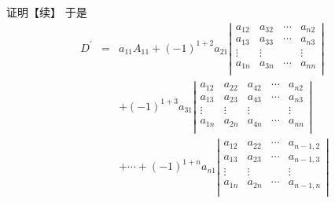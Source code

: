 \begin{frame}
  \begin{block}{证明【续】}
    于是
    $$
    \begin{array}{rcl}
      D^\prime &=& a_{11} A_{11}+(-1)^{1+2}a_{21}
      \left|
      \begin{array}{cccc}
        a_{12} & a_{32} & \cdots & a_{n2} \\
        a_{13} & a_{33} & \cdots & a_{n3} \\
        \vdots & \vdots & & \vdots \\
        a_{1n} & a_{3n} & \cdots & a_{nn} \\
      \end{array}
      \right| \\[0.4in]
      && + (-1)^{1+3}a_{31}
      \left|
      \begin{array}{ccccc}
        a_{12} & a_{22} & a_{42} & \cdots & a_{n2} \\
        a_{13} & a_{23} & a_{43} & \cdots & a_{n3} \\
        \vdots & \vdots & \vdots & & \vdots \\
        a_{1n} & a_{2n} & a_{4n} & \cdots & a_{nn} \\
      \end{array}
      \right|  \\[0.4in]
      && + \cdots + (-1)^{1+n} a_{n1} \left|
      \begin{array}{cccc}
        a_{12} & a_{22} & \cdots & a_{n-1,2} \\
        a_{13} & a_{23} & \cdots & a_{n-1,3} \\
        \vdots & \vdots & & \vdots \\
        a_{1n} & a_{2n} & \cdots & a_{n-1,n} \\
      \end{array}
      \right|
    \end{array}
    $$
  \end{block}
\end{frame}




